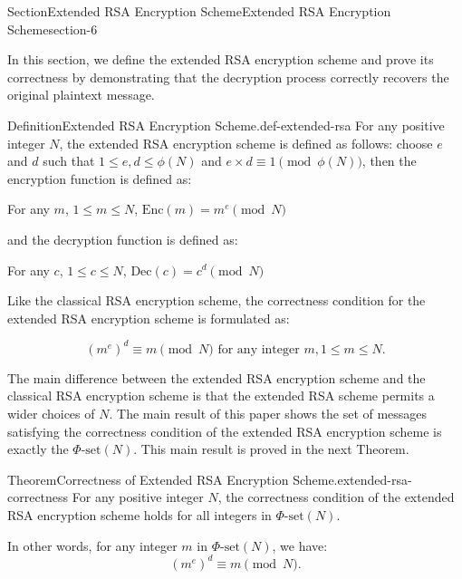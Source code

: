 \documentclass[oneside,12pt,]{article}
\numberwithin{equation}{section}
\begin{document}
\begin{sectionptx}{Section}{Extended RSA Encryption Scheme}{}{Extended RSA Encryption Scheme}{}{}{section-6}
\begin{introduction}{}%
In this section, we define the extended RSA encryption scheme and prove its correctness by demonstrating that the decryption process correctly recovers the original plaintext message.%
\end{introduction}%
\begin{definition}{Definition}{Extended RSA Encryption Scheme.}{def-extended-rsa}%
For any positive integer \(N\), the extended RSA encryption scheme is defined as follows: choose \(e\) and \(d\) such that \(1 \leq e, d \leq \phi(N)\) and \(e \times d \equiv 1 \pmod{\phi(N)}\), then the encryption function is defined as:%
\par
For any \(m\), \(1 \leq m \leq N\), \(\text{Enc}(m) = m^e \pmod{N}\)%
\par
and the decryption function is defined as:%
\par
For any \(c\), \(1 \leq c \leq N\), \(\text{Dec}(c) = c^d \pmod{N}\)%
\end{definition}
Like the classical RSA encryption scheme, the correctness condition for the extended RSA encryption scheme is formulated as:%
\par
%
\begin{equation*}
(m^e)^d \equiv m \pmod{N} \text{ for any integer } m, 1 \leq m \leq N\text{.}
\end{equation*}
%
\par
The main difference between the extended RSA encryption scheme and the classical RSA encryption scheme is that the extended RSA scheme permits a wider choices of \(N\). The main result of this paper shows the set of messages satisfying the correctness condition of the extended RSA encryption scheme is exactly the \(\Phi\text{-set}(N)\). This main result is proved in the next Theorem.%
\begin{theorem}{Theorem}{Correctness of Extended RSA Encryption Scheme.}{}{extended-rsa-correctness}%
For any positive integer \(N\), the correctness condition of the extended RSA encryption scheme holds for all integers in \(\Phi\text{-set}(N)\).%
\par
In other words, for any integer \(m\) in \(\Phi\text{-set}(N)\), we have:%
\begin{equation*}
(m^e)^d \equiv m \pmod{N}\text{.}
\end{equation*}
%
\end{theorem}

\end{sectionptx}
\end{document}

